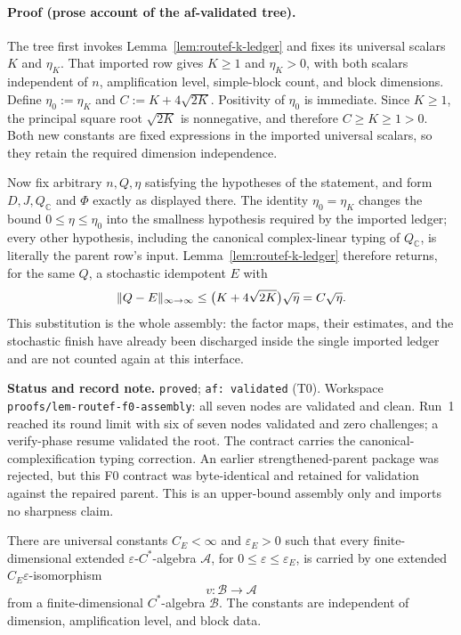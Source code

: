 \paragraph{Proof (prose account of the af-validated tree).}
The tree first invokes Lemma~\ref{lem:routef-k-ledger} and fixes its universal
scalars $K$ and $\eta_{K}$.  That imported row gives $K\ge1$ and
$\eta_{K}>0$, with both scalars independent of $n$, amplification level,
simple-block count, and block dimensions.  Define
$\eta_{0}:=\eta_{K}$ and $C:=K+4\sqrt{2K}$.  Positivity of $\eta_{0}$ is
immediate.  Since $K\ge1$, the principal square root $\sqrt{2K}$ is
nonnegative, and therefore $C\ge K\ge1>0$.  Both new constants are fixed
expressions in the imported universal scalars, so they retain the required
dimension independence.

Now fix arbitrary $n,Q,\eta$ satisfying the hypotheses of the statement, and
form $D,J,Q_{\mathbb C}$ and $\Phi$ exactly as displayed there.  The identity
$\eta_{0}=\eta_{K}$ changes the bound $0\le\eta\le\eta_{0}$ into the
smallness hypothesis required by the imported ledger; every other hypothesis,
including the canonical complex-linear typing of $Q_{\mathbb C}$, is literally
the parent row's input.  Lemma~\ref{lem:routef-k-ledger} therefore returns, for
the same $Q$, a stochastic idempotent $E$ with
\[
  \lVert Q-E\rVert_{\infty\to\infty}
  \le \bigl(K+4\sqrt{2K}\bigr)\sqrt\eta
  =C\sqrt\eta .
\]
This substitution is the whole assembly: the factor maps, their estimates, and
the stochastic finish have already been discharged inside the single imported
ledger and are not counted again at this interface.

\medskip
\noindent\textbf{Status and record note.} \texttt{proved};
\texttt{af: validated} (T0).  Workspace
\texttt{proofs/lem-routef-f0-assembly}: all seven nodes are validated and clean.
Run~1 reached its round limit with six of seven nodes validated and zero
challenges; a verify-phase resume validated the root.  The contract carries the
canonical-complexification typing correction.  An earlier strengthened-parent
package was rejected, but this F0 contract was byte-identical and retained for
validation against the repaired parent.  This is an upper-bound assembly only
and imports no sharpness claim.

\begin{lemma}\label{lem:thmainext-conditional}
There are universal constants $C_{E}<\infty$ and $\varepsilon_{E}>0$ such that
every finite-dimensional extended $\varepsilon$-$C^{*}$-algebra $\mathcal A$,
for $0\le\varepsilon\le\varepsilon_{E}$, is carried by one extended
$C_{E}\varepsilon$-isomorphism
\[
  v:\mathcal B\longrightarrow\mathcal A
\]
from a finite-dimensional $C^{*}$-algebra $\mathcal B$.  The constants are
independent of dimension, amplification level, and block data.
\end{lemma}

